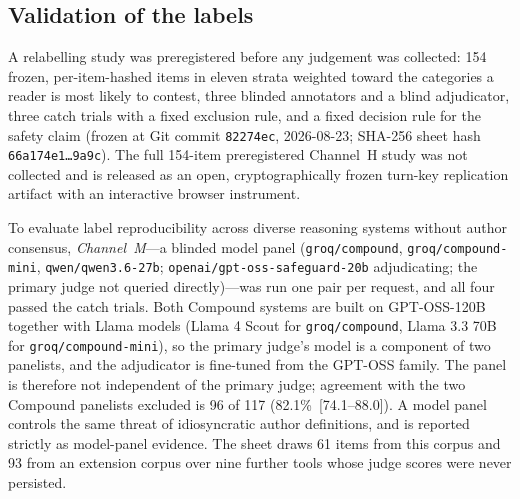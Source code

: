 \subsection{Validation of the labels}\label{sec:method-labels}

A relabelling study was preregistered before any judgement was collected: 154 frozen, per-item-hashed items in eleven strata weighted toward the categories a reader is most likely to contest, three blinded annotators and a blind adjudicator, three catch trials with a fixed exclusion rule, and a fixed decision rule for the safety claim (frozen at Git commit \texttt{82274ec}, 2026-08-23; SHA-256 sheet hash \texttt{66a174e1\dots9a9c}). The full 154-item preregistered Channel~H study was not collected and is released as an open, cryptographically frozen turn-key replication artifact with an interactive browser instrument.

To evaluate label reproducibility across diverse reasoning systems without author consensus, \emph{Channel~M}---a blinded model panel (\texttt{groq/compound}, \texttt{groq/compound-mini}, \texttt{qwen/qwen3.6-27b}; \texttt{openai/gpt-oss-safeguard-20b} adjudicating; the primary judge not queried directly)---was run one pair per request, and all four passed the catch trials. Both Compound systems are built on GPT-OSS-120B together with Llama models (Llama 4 Scout for \texttt{groq/compound}, Llama 3.3 70B for \texttt{groq/compound-mini}), so the primary judge's model is a component of two panelists, and the adjudicator is fine-tuned from the GPT-OSS family. The panel is therefore not independent of the primary judge; agreement with the two Compound panelists excluded is 96 of 117 (82.1\%~[74.1--88.0]). A model panel controls the same threat of idiosyncratic author definitions, and is reported strictly as model-panel evidence. The sheet draws 61 items from this corpus and 93 from an extension corpus over nine further tools whose judge scores were never persisted.

